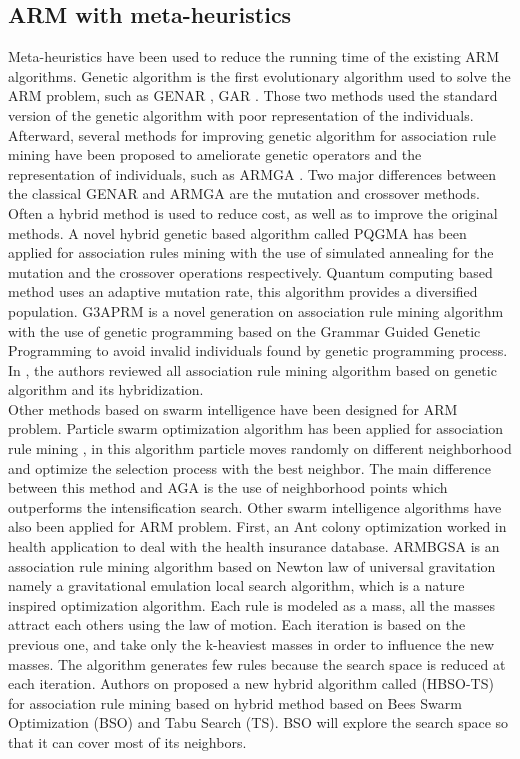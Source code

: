 \documentclass[preprint,12pt]{elsarticle}
\begin{document}
\subsection{ARM with meta-heuristics}
Meta-heuristics have been used to reduce the running time of the existing ARM algorithms. Genetic algorithm is the first evolutionary algorithm used to solve the ARM problem, such as GENAR \cite{16}, GAR \cite{17}. 
Those two methods used the standard version of the genetic algorithm with poor representation of the individuals. Afterward, several methods 
for improving genetic algorithm for association rule mining have been proposed to ameliorate genetic operators and the 
representation of individuals, such as ARMGA \cite{10}. Two major differences between the classical GENAR and ARMGA are the mutation and crossover methods. Often a hybrid method is used to reduce cost, as well as to improve the original methods. A novel hybrid genetic based algorithm called PQGMA has been applied for association rules mining with the use of simulated annealing for the mutation and the crossover operations respectively.
Quantum computing based method \cite{18} uses an adaptive mutation rate, this algorithm provides a diversified population.
G3APRM \cite{11} is a novel generation on association rule mining algorithm with the use of  genetic programming based on the 
Grammar Guided Genetic Programming to avoid invalid individuals found by genetic programming process. In \cite{19}, 
the authors reviewed all association rule mining algorithm based on genetic algorithm and its hybridization.\\
Other methods based on swarm intelligence have been designed for ARM problem. 
Particle swarm optimization algorithm has been applied for association rule mining \cite{12}, 
in this algorithm particle moves randomly on different neighborhood and optimize the selection process with the best neighbor. 
The main difference between this method and AGA is the use of neighborhood points which outperforms the intensification search. 
Other swarm intelligence algorithms have also been applied for ARM problem. First, an Ant colony optimization \cite{20} worked in health application 
to deal with the health insurance database. ARMBGSA \cite{21} is an association rule mining algorithm based on Newton law of universal gravitation namely 
a gravitational emulation local search algorithm, which is a nature inspired optimization algorithm. Each rule is modeled as a mass, all the masses attract each others using the law of motion. Each iteration is based on the 
previous one, and take only the k-heaviest masses in order to influence the new masses. The algorithm generates few rules because 
the search space is reduced at each iteration. 
Authors on \cite{22} proposed a new hybrid algorithm called (HBSO-TS) for association rule mining based on hybrid method based on 
Bees Swarm Optimization (BSO) and Tabu Search (TS). BSO will explore the search space so that it can cover most of its neighbors. 
\end{document}
